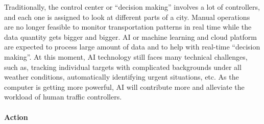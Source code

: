 \documentclass[letterpaper, twocolumn, 10pt, conference]{IEEEtran}
\begin{document}

Traditionally, the control center or \enquote{decision making} involves a lot of controllers, and each one is assigned to look at different parts of a city. Manual operations are no longer feasible to monitor transportation patterns in real time while the data quantity gets bigger and bigger.
AI or machine learning and cloud platform are expected to process large amount of data and to help with real-time \enquote{decision making}. At this moment, AI technology still faces many technical challenges, such as, tracking individual targets with complicated backgrounds under all weather conditions, automatically identifying urgent situations, etc. As the computer is getting more powerful, AI will contribute more and alleviate the workload of human traffic controllers.





\paragraph{Action}
\end{document}
